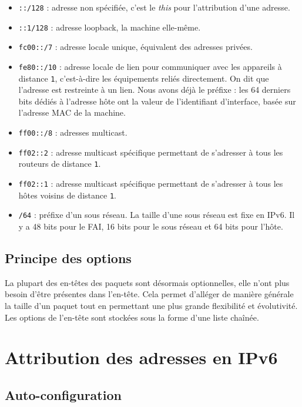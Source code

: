 \begin{itemize}
  \item	\texttt{::/128} : adresse non spécifiée, c’est le \emph{this} pour l’attribution d’une adresse.
  \item	\texttt{::1/128} : adresse loopback, la machine elle-même.
  \item	\texttt{fc00::/7} : adresse locale unique, équivalent des adresses privées.
  \item \texttt{fe80::/10} : adresse locale de lien pour communiquer avec les appareils à distance \texttt{1}, c’est-à-dire les équipements reliés directement.
On dit que l’adresse est restreinte à un lien.
Nous avons déjà le préfixe : les 64 derniers bits dédiés à l’adresse hôte ont la valeur de l’identifiant d’interface, basée sur l’adresse MAC de la machine.
  \item \texttt{ff00::/8} : adresses multicast.
  \item \texttt{ff02::2} : adresse multicast spécifique permettant de s’adresser à tous les routeurs de distance \texttt{1}.
  \item \texttt{ff02::1} : adresse multicast spécifique permettant de s’adresser à tous les hôtes voisins de distance \texttt{1}.
  \item \texttt{/64} : préfixe d’un sous réseau. La taille d’une sous réseau est fixe en IPv6.
Il y a 48 bits pour le FAI, 16 bits pour le sous réseau et 64 bits pour l’hôte.
\end{itemize}

\subsection{Principe des options}

La plupart des en-têtes des paquets sont désormais optionnelles, elle n'ont plus besoin d'être présentes dans l'en-tête.
Cela permet d’alléger de manière générale la taille d’un paquet tout en permettant une plus grande flexibilité et évolutivité.
Les options de l’en-tête sont stockées sous la forme d’une liste chaînée.

\newpage
\section{Attribution des adresses en IPv6}

\subsection{Auto-configuration}

